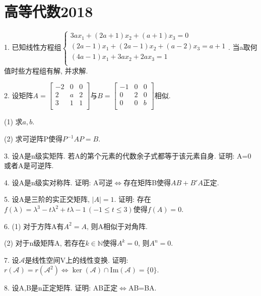 \documentclass[12pt, a4paper, twoside]{ctexart}%
\begin{document}
	\section{高等代数2018}
	1. 已知线性方程组$\begin{cases}
		3ax_1+(2a+1)x_2+(a+1)x_3=0\\
		(2a-1)x_1+(2a-1)x_2+(a-2)x_3=a+1\\
		(4a-1)x_1+3ax_2+2ax_3=1\\
	\end{cases}$. 当a取何值时些方程组有解, 并求解.\par
	2. 设矩阵$A=\begin{bmatrix}
		-2&0&0\\
		2&a&2\\
		3&1&1\\
	\end{bmatrix}$与$B=\begin{bmatrix}
	-1&0&0\\
	0&2&0\\
	0&0&b\\
	\end{bmatrix}$相似.\par
	\hspace{1.2em}(1) 求$a,b$.\par 
	\hspace{1.2em}(2) 求可逆阵P使得$P^{-1}AP=B$.\par 
	3. 设A是n级实矩阵. 若A的第个元素的代数余子式都等于该元素自身. 证明: A=0或者A是可逆阵.\par
	4. 设A是n级实对称阵. 证明: A可逆$\iff$存在矩阵B使得$AB+B'A$正定.\par
	5. 设A是三阶的实正交矩阵, $|A|=1$. 证明: 存在$f(\lambda)=\lambda^3-t\lambda^2+t\lambda-1\,(-1\leq t\leq 3)$使得$f(A)=0$.\par 
	6. (1) 对于方阵A有$A^2=A$, 则A相似于对角阵.\par
	\hspace{1.2em}(2) 对于n级矩阵A, 若存在$k\in\mathbb{N}$使得$A^k=0$, 则$A^n=0$.\par 
	7. 设$\mathscr{A}$是线性空间V上的线性变换. 证明: $r(\mathscr{A})=r(\mathscr{A}^2)\iff\ker(\mathscr{A})\cap\mathrm{Im}(\mathscr{A})=\{0\}$.\par 
	8. 设A,B是n正定矩阵. 证明: AB正定$\iff$AB=BA. \par 
	
	\clearpage
\end{document}
